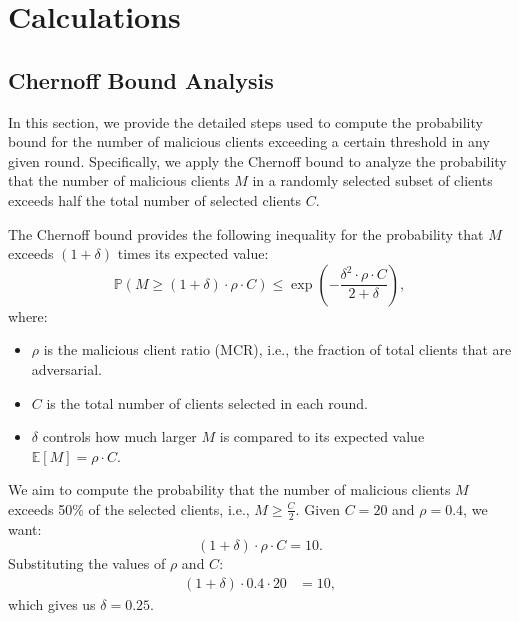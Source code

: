 \section{Calculations}
\label{sec:calculations}

\subsection{Chernoff Bound Analysis}
\label{sec:chernoff_appendix}

In this section, we provide the detailed steps used to compute the probability bound for the number of malicious clients exceeding a certain threshold in any given round. Specifically, we apply the Chernoff bound to analyze the probability that the number of malicious clients \( M \) in a randomly selected subset of clients exceeds half the total number of selected clients \( C \).

The Chernoff bound provides the following inequality for the probability that \( M \) exceeds \((1 + \delta)\) times its expected value:
\begin{equation}
    \mathbb{P}\left(M \geq (1 + \delta) \cdot \rho \cdot C \right) \leq \exp\left(-\frac{\delta^2 \cdot \rho \cdot C}{2 + \delta}\right),
\end{equation}
where:
\begin{itemize}
    \item \( \rho \) is the malicious client ratio (MCR), i.e., the fraction of total clients that are adversarial.
    \item \( C \) is the total number of clients selected in each round.
    \item \( \delta \) controls how much larger \( M \) is compared to its expected value \( \mathbb{E}[M] = \rho \cdot C \).
\end{itemize}

We aim to compute the probability that the number of malicious clients \( M \) exceeds 50\% of the selected clients, i.e., \( M \geq \frac{C}{2} \). Given \( C = 20 \) and \( \rho = 0.4 \), we want:
\[
(1 + \delta) \cdot \rho \cdot C = 10.
\]
Substituting the values of \( \rho \) and \( C \):
\begin{align}
    (1 + \delta) \cdot 0.4 \cdot 20 & = 10,     \nonumber
\end{align}
which gives us $\delta = 0.25$.

